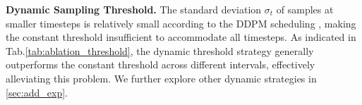 \textbf{Dynamic Sampling Threshold.} The standard deviation $\sigma_t$ of samples at smaller timesteps is relatively small according to the DDPM scheduling \cite{ddpm}, making the constant threshold insufficient to accommodate all timesteps. As indicated in Tab.\;\ref{tab:ablation_threshold}, the dynamic threshold strategy generally outperforms the constant threshold across different intervals, effectively alleviating this problem. We further explore other dynamic strategies in \cref{sec:add_exp}.


